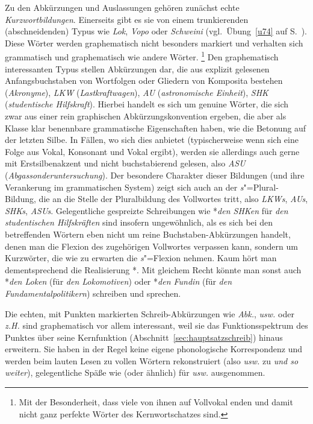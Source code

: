 Zu den Abkürzungen und Auslassungen gehören zunächst echte \textit{Kurzwortbildungen}.
Einerseits gibt es sie von einem trunkierenden (abschneidenden) Typus wie \textit{Lok}, \textit{Vopo} oder \textit{Schweini} (vgl.\ Übung~\ref{u74} auf S.~\pageref{u74}).
Diese Wörter werden graphematisch nicht besonders markiert und verhalten sich grammatisch und graphematisch wie andere Wörter.%
\footnote{Mit der Besonderheit, dass viele von ihnen auf Vollvokal enden und damit nicht ganz perfekte Wörter des Kernwortschatzes sind.}
Den graphematisch interessanten Typus stellen Abkürzungen dar, die aus explizit gelesenen Anfangsbuchstaben von Wortfolgen oder Gliedern von Komposita bestehen (\textit{Akronyme}), \zB \textit{LKW} \textipa{[PElkave:]} (\textit{Lastkraftwagen}), \textit{AU} \textipa{[Pa:Pu:]} (\textit{astronomische Einheit}), \textit{SHK} \textipa{[PEshaka:]} (\textit{studentische Hilfskraft}).
Hierbei handelt es sich um genuine Wörter, die sich zwar aus einer rein graphischen Abkürzungskonvention ergeben, die aber als Klasse klar benennbare grammatische Eigenschaften haben, wie \zB die Betonung auf der letzten Silbe.
In Fällen, wo sich dies anbietet (typischerweise wenn sich eine Folge aus Vokal, Konsonant und Vokal ergibt), werden sie allerdings auch gerne mit Erstsilbenakzent und nicht buchstabierend gelesen, also \textit{ASU} \textipa{[Pa:zu]} (\textit{Abgassonderuntersuchung}).
Der besondere Charakter dieser Bildungen (und ihre Verankerung im grammatischen System) zeigt sich auch an der \textit{s}"=Plural-Bildung, die an die Stelle der Pluralbildung des Vollwortes tritt, also \textit{LKWs}, \textit{AUs}, \textit{SHKs}, \textit{ASUs}.
Gelegentliche gespreizte Schreibungen wie *\textit{den SHKen} für \textit{den studentischen Hilfskräften} sind insofern ungewöhnlich, als es sich bei den betreffenden Wörtern eben nicht um reine Buchstaben-Abkürzungen handelt, denen man die Flexion des zugehörigen Vollwortes verpassen kann, sondern um Kurzwörter, die wie zu erwarten die \textit{s}"=Flexion nehmen.
Kaum hört man dementsprechend die Realisierung *\textipa{[PEshaka:@n]}.
Mit gleichem Recht könnte man sonst auch *\textit{den Loken} (für \textit{den Lokomotiven}) oder *\textit{den Fundin} (für \textit{den Fundamentalpolitikern}) schreiben und sprechen.

Die echten, mit Punkten markierten Schreib-Abkürzungen wie \textit{Abk.}, \textit{usw.} oder \textit{z.H.} sind graphematisch vor allem interessant, weil sie das Funktionsspektrum des Punktes über seine Kernfunktion (Abschnitt~\ref{sec:hauptsatzschreib}) hinaus erweitern.
Sie haben in der Regel keine eigene phonologische Korrespondenz und werden beim lauten Lesen zu vollen Wörtern rekonstruiert (also \zB \textit{usw.} zu \textit{und so weiter}), gelegentliche Späße wie \zB \textipa{[PUz@v@]} (oder ähnlich) für \textit{usw.} ausgenommen.


